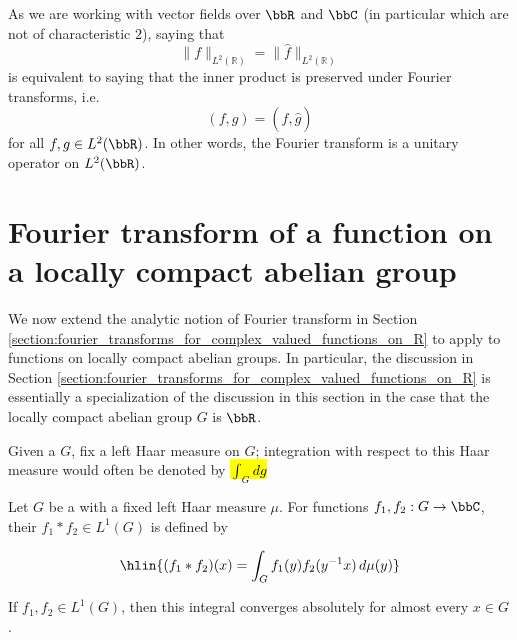 \begin{remark}
    As we are working with vector fields over $\bbR$ and $\bbC$ (in particular which are not of characteristic $2$), saying that \[ \| f \|_{L^{2}(\mathbb{R})} = \| \hat{f} \|_{L^{2}(\mathbb{R})}\] is equivalent to saying that the inner product is preserved under Fourier transforms, i.e. $$(f,g) = (\hat{f}, \hat{g})$$ for all $f,g \in L^2(\bbR)$. In other words, the Fourier transform is a unitary operator on $L^2(\bbR)$.
\end{remark}

\section{Fourier transform of a function on a locally compact abelian group}

We now extend the analytic notion of Fourier transform in Section \ref{section:fourier_transforms_for_complex_valued_functions_on_R} to apply to functions on locally compact abelian groups. In particular, the discussion in Section \ref{section:fourier_transforms_for_complex_valued_functions_on_R} is essentially a specialization of the discussion in this section in the case that the locally compact abelian group $G$ is $\bbR$.








\begin{notation}
    Given a  $G$, fix a left Haar measure on $G$; integration with respect to this Haar measure would often be denoted by \hl{$\int_G dg$}
\end{notation}

\begin{definition}
    Let \( G \) be a  with a fixed left Haar measure \( \mu \). For functions $f_1, f_2: G \to \bbC$, their  \( f_1 * f_2 \in L^1(G) \) is defined by

    $$\hlin{(f_1 * f_2)(x) = \int_G f_1(y) f_2(y^{-1} x) \, d\mu(y)}$$

    If $f_1,f_2 \in L^1(G)$, then this integral converges absolutely for almost every $x \in G$.
\end{definition}

